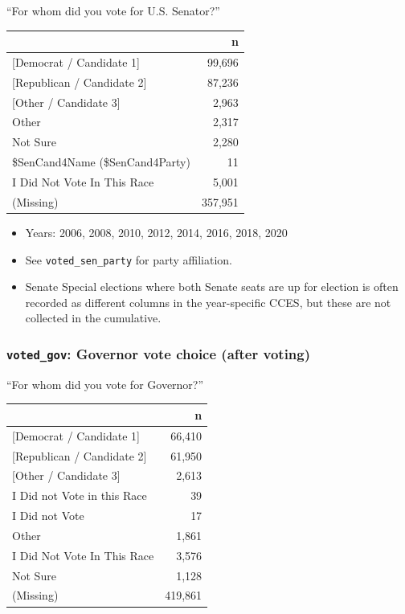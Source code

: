 \documentclass[10pt,article,oneside]{memoir}
\theoremstyle{definition}
\begin{document}
``For whom did you vote for U.S. Senator?''

\begin{table}[H]
\centering
\begin{tabular}[t]{lr}
\toprule
 & n\\
\midrule
{}{[Democrat / Candidate 1]} & 99,696\\
{}{[Republican / Candidate 2]} & 87,236\\
{}{[Other / Candidate 3]} & 2,963\\
Other & 2,317\\
Not Sure & 2,280\\
\$SenCand4Name (\$SenCand4Party) & 11\\
I Did Not Vote In This Race & 5,001\\
(Missing) & 357,951\\
\bottomrule
\end{tabular}
\end{table}

\begin{itemize}
\tightlist
\item
  Years: 2006, 2008, 2010, 2012, 2014, 2016, 2018, 2020
\item
  See \texttt{voted\_sen\_party} for party affiliation.
\item
  Senate Special elections where both Senate seats are up for election
  is often recorded as different columns in the year-specific CCES, but
  these are not collected in the cumulative.
\end{itemize}

\hypertarget{voted_gov-governor-vote-choice-after-voting}{%
\subsubsection{\texorpdfstring{\texttt{voted\_gov}: Governor vote choice
(after
voting)}{voted\_gov: Governor vote choice (after voting)}}\label{voted_gov-governor-vote-choice-after-voting}}

``For whom did you vote for Governor?''

\begin{table}[H]
\centering
\begin{tabular}[t]{lr}
\toprule
 & n\\
\midrule
{}{[Democrat / Candidate 1]} & 66,410\\
{}{[Republican / Candidate 2]} & 61,950\\
{}{[Other / Candidate 3]} & 2,613\\
I Did not Vote in this Race & 39\\
I Did not Vote & 17\\
Other & 1,861\\
I Did Not Vote In This Race & 3,576\\
Not Sure & 1,128\\
(Missing) & 419,861\\
\bottomrule
\end{tabular}
\end{table}
\end{document}
